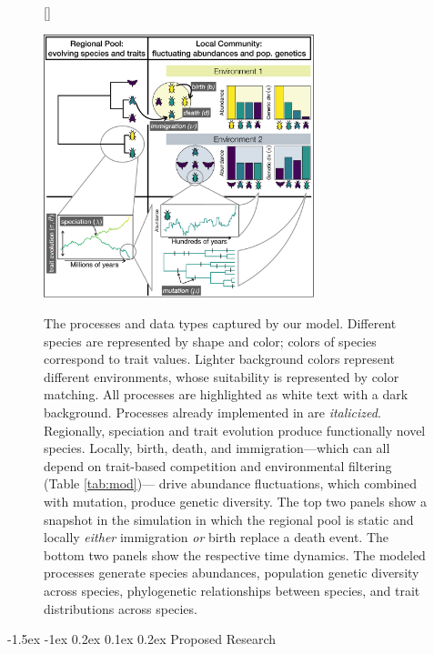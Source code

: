 \documentclass[11pt]{article}
\makeatletter
\renewcommand\section{\@startsection{section}{1}{\z@}%
                                  {-1.5ex \@plus -1ex \@minus 0.2ex}%
                                  {0.1ex \@plus 0.2ex}%
                                  {\normalfont\Large\bfseries}}
\makeatother
\begin{document}
\begin{figure}[!htb]
  [\FBwidth]
  {\caption{The processes and data types captured by our
      model. Different species are represented by shape and color;
      colors of species correspond to trait values. Lighter background
      colors represent different environments, whose suitability is
      represented by color matching. All processes are highlighted as
      white text with a dark background. Processes already implemented
      in \cite{Overcast2017-mf} are {\it italicized}. Regionally,
      speciation and trait evolution produce functionally novel
      species. Locally, birth, death, and immigration---which can all
      depend on trait-based competition and environmental filtering
      (Table \ref{tab:mod})--- drive abundance fluctuations, which
      combined with mutation, produce genetic diversity. The top two
      panels show a snapshot in the simulation in which the regional
      pool is static and locally {\it either} immigration {\it or}
      birth replace a death event. The bottom two panels show the
      respective time dynamics. The modeled processes generate species
      abundances, population genetic diversity across species,
      phylogenetic relationships between species, and trait
      distributions across species.}\label{fig:mod}}
  {\includegraphics[width=0.7\textwidth]{../fig_mod.pdf}}
\end{figure}


\section{Proposed Research}\label{proposed-research}
\end{document}
